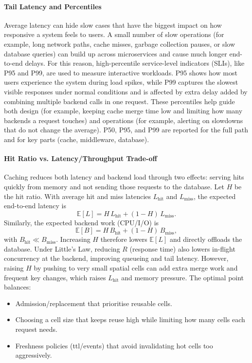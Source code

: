 \paragraph{Tail Latency and Percentiles}
Average latency can hide slow cases that have the biggest impact on how responsive a system feels to users. A small number of slow operations (for example, long network paths, cache misses, garbage collection pauses, or slow database queries) can build up across microservices and cause much longer end-to-end delays. For this reason, high-percentile service-level indicators (SLIs), like P95 and P99, are used to measure interactive workloads. P95 shows how most users experience the system during load spikes, while P99 captures the slowest visible responses under normal conditions and is affected by extra delay added by combining multiple backend calls in one request. These percentiles help guide both design (for example, keeping cache merge time low and limiting how many backends a request touches) and operations (for example, alerting on slowdowns that do not change the average). P50, P95, and P99 are reported for the full path and for key parts (cache, middleware, database).

\paragraph{Hit Ratio vs. Latency/Throughput Trade-off}
Caching reduces both latency and backend load through two effects: serving hits quickly from memory and not sending those requests to the database. Let $H$ be the hit ratio. With average hit and miss latencies $L_{\mathrm{hit}}$ and $L_{\mathrm{miss}}$, the expected end-to-end latency is
\[
\mathbb{E}[L] = H\,L_{\mathrm{hit}} + (1-H)\,L_{\mathrm{miss}}.
\]
Similarly, the expected backend work (CPU/I/O) is 
\[
\mathbb{E}[B] = H\,B_{\mathrm{hit}} + (1-H)\,B_{\mathrm{miss}},
\]
with $B_{\mathrm{hit}}\!\ll\!B_{\mathrm{miss}}$. Increasing $H$ therefore lowers $\mathbb{E}[L]$ and directly offloads the database. Under Little's Law, reducing $R$ (response time) also lowers in-flight concurrency at the backend, improving queueing and tail latency. However, raising $H$ by pushing to very small spatial cells can add extra merge work and frequent key changes, which raises $L_{\mathrm{hit}}$ and memory pressure. The optimal point balances:
\begin{itemize}
  \item Admission/replacement that prioritise reusable cells.
  \item Choosing a cell size that keeps reuse high while limiting how many cells each request needs.
  \item Freshness policies (\ac{ttl}/events) that avoid invalidating hot cells too aggressively.
\end{itemize}

